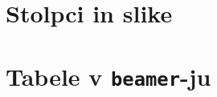 \documentclass{beamer}
\begin{document}
\section{Stolpci in slike}


\section{Tabele v \texttt{beamer}-ju}



\end{document}

